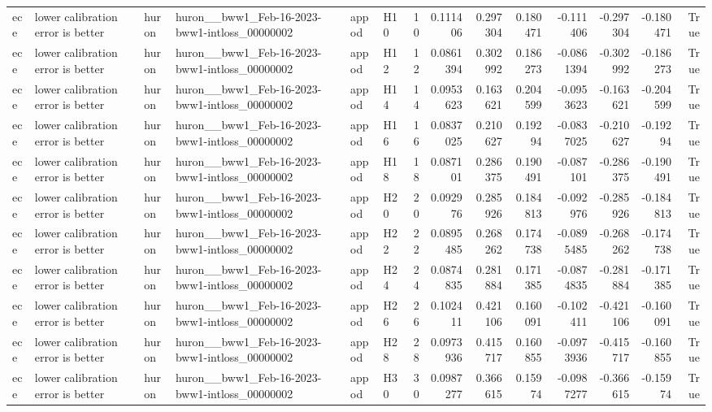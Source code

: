 \begin{longtable}{llllllrrrrrrrr}
ece & lower calibration error is better & huron & huron\_\_bww1\_Feb-16-2023-bww1-intloss\_00000002 & appod & H10 & 10 & 0.111406 & 0.297304 & 0.180471 & -0.111406 & -0.297304 & -0.180471 & True \\
ece & lower calibration error is better & huron & huron\_\_bww1\_Feb-16-2023-bww1-intloss\_00000002 & appod & H12 & 12 & 0.0861394 & 0.302992 & 0.186273 & -0.0861394 & -0.302992 & -0.186273 & True \\
ece & lower calibration error is better & huron & huron\_\_bww1\_Feb-16-2023-bww1-intloss\_00000002 & appod & H14 & 14 & 0.0953623 & 0.163621 & 0.204599 & -0.0953623 & -0.163621 & -0.204599 & True \\
ece & lower calibration error is better & huron & huron\_\_bww1\_Feb-16-2023-bww1-intloss\_00000002 & appod & H16 & 16 & 0.0837025 & 0.210627 & 0.19294 & -0.0837025 & -0.210627 & -0.19294 & True \\
ece & lower calibration error is better & huron & huron\_\_bww1\_Feb-16-2023-bww1-intloss\_00000002 & appod & H18 & 18 & 0.087101 & 0.286375 & 0.190491 & -0.087101 & -0.286375 & -0.190491 & True \\
ece & lower calibration error is better & huron & huron\_\_bww1\_Feb-16-2023-bww1-intloss\_00000002 & appod & H20 & 20 & 0.092976 & 0.285926 & 0.184813 & -0.092976 & -0.285926 & -0.184813 & True \\
ece & lower calibration error is better & huron & huron\_\_bww1\_Feb-16-2023-bww1-intloss\_00000002 & appod & H22 & 22 & 0.0895485 & 0.268262 & 0.174738 & -0.0895485 & -0.268262 & -0.174738 & True \\
ece & lower calibration error is better & huron & huron\_\_bww1\_Feb-16-2023-bww1-intloss\_00000002 & appod & H24 & 24 & 0.0874835 & 0.281884 & 0.171385 & -0.0874835 & -0.281884 & -0.171385 & True \\
ece & lower calibration error is better & huron & huron\_\_bww1\_Feb-16-2023-bww1-intloss\_00000002 & appod & H26 & 26 & 0.102411 & 0.421106 & 0.160091 & -0.102411 & -0.421106 & -0.160091 & True \\
ece & lower calibration error is better & huron & huron\_\_bww1\_Feb-16-2023-bww1-intloss\_00000002 & appod & H28 & 28 & 0.0973936 & 0.415717 & 0.160855 & -0.0973936 & -0.415717 & -0.160855 & True \\
ece & lower calibration error is better & huron & huron\_\_bww1\_Feb-16-2023-bww1-intloss\_00000002 & appod & H30 & 30 & 0.0987277 & 0.366615 & 0.15974 & -0.0987277 & -0.366615 & -0.15974 & True \\

\end{longtable}
